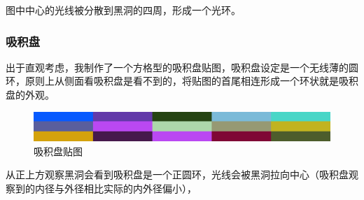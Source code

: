 图中中心的光线被分散到黑洞的四周，形成一个光环。

\subsubsection{吸积盘}
出于直观考虑，我制作了一个方格型的吸积盘贴图，吸积盘设定是一个无线薄的圆环，原则上从侧面看吸积盘是看不到的，将贴图的首尾相连形成一个环状就是吸积盘的外观。
\begin{figure}[H]
    \centering
    \includegraphics[scale=0.5]{images/flag.png}
    \caption{吸积盘贴图}
    \label{fig:disk-flag-texutre} %
\end{figure}
从正上方观察黑洞会看到吸积盘是一个正圆环，光线会被黑洞拉向中心（吸积盘观察到的内径与外径相比实际的内外径偏小），
